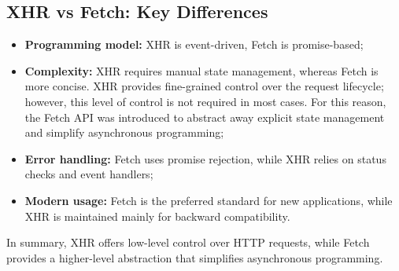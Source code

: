 \documentclass{scrbook}
\begin{document}
	\subsection{XHR vs Fetch: Key Differences}
	
	\begin{itemize}
		\item \textbf{Programming model:} XHR is event-driven, Fetch is promise-based;
		
		\item \textbf{Complexity:} XHR requires manual state management, whereas Fetch is more concise.
		XHR provides fine-grained control over the request lifecycle; however, this level of control is not required in most cases. 
		For this reason, the Fetch API was introduced to abstract away explicit state management and simplify asynchronous programming;
		
		\item \textbf{Error handling:} Fetch uses promise rejection, while XHR relies on status checks and event handlers;
		
		\item \textbf{Modern usage:} Fetch is the preferred standard for new applications, while XHR is maintained mainly for backward compatibility.
	\end{itemize}
	
	In summary, XHR offers low-level control over HTTP requests, while Fetch provides a higher-level abstraction that simplifies asynchronous programming.
\end{document}
